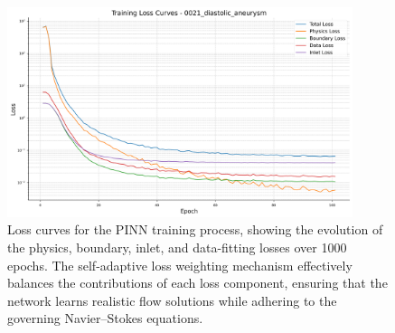 \documentclass[12pt, a4paper]{article}
\begin{document}
\begin{figure}[H]
    \centering
    \scriptsize
    \includegraphics[width=0.9\textwidth]{0021_diastolic_aneurysm/0021_diastolic_aneurysm/loss_curves_0021_diastolic_aneurysm.png}
    \caption{Loss curves for the PINN training process, showing the evolution of the physics, boundary, inlet, and data-fitting losses over 1000 epochs. The self-adaptive loss weighting mechanism effectively balances the contributions of each loss component, ensuring that the network learns realistic flow solutions while adhering to the governing Navier--Stokes equations.}
    \label{fig:loss_curves1}
\end{figure}





\end{document}
